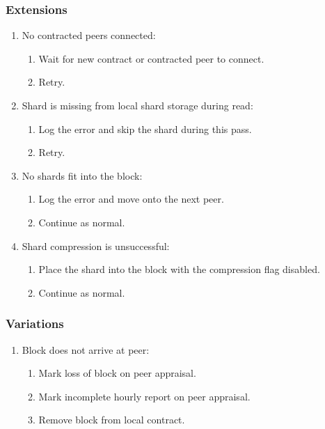 \documentclass[11pt, a4paper, twocolumn, twoside]{report}
\begin{document}
\subsubsection{Extensions}
\begin{enumerate}
  \item No contracted peers connected:
	\begin{enumerate}
	  \item Wait for new contract or contracted peer to connect.
	  \item Retry.
	\end{enumerate}
  \item Shard is missing from local shard storage during read:
	\begin{enumerate}
	  \item Log the error and skip the shard during this pass.
	  \item Retry.
	\end{enumerate}
  \item No shards fit into the block:
	\begin{enumerate}
	  \item Log the error and move onto the next peer.
	  \item Continue as normal.
	\end{enumerate}
  \item Shard compression is unsuccessful:
	\begin{enumerate}
	  \item Place the shard into the block with the compression flag disabled.
	  \item Continue as normal.
	\end{enumerate}
\end{enumerate}

\subsubsection{Variations}
\begin{enumerate}
  \item Block does not arrive at peer:
	\begin{enumerate}
	  \item Mark loss of block on peer appraisal.
	  \item Mark incomplete hourly report on peer appraisal.
	  \item Remove block from local contract.
	\end{enumerate}
\end{enumerate}
\end{document}
